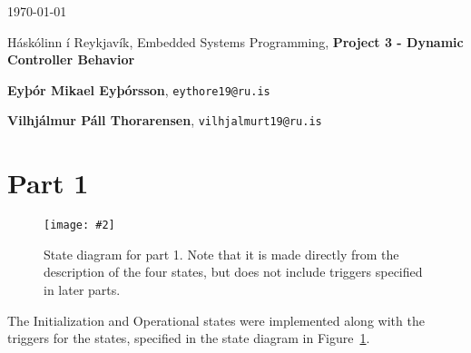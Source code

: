 \documentclass{article}
\newcommand{\state}[3]{
    \begin{figure}[h]
        \begin{center}
            \texttt{[image: \#2]}
        \end{center}
        \caption{#3}\label{fig:state-part-#1}
    \end{figure}
}
\begin{document}
\today \par
\vspace{.5cm}
\noindent Háskólinn í Reykjavík, Embedded Systems Programming, \textbf{Project 3 - Dynamic
	Controller Behavior} \par
\noindent \textbf{Eyþór Mikael Eyþórsson}, \texttt{eythore19@ru.is}\par
\noindent \textbf{Vilhjálmur Páll Thorarensen}, \texttt{vilhjalmurt19@ru.is}\par

\section*{Part 1}
\state{1}{../code/docs/diagrams/src/state-part1.mmd.png}{
    State diagram for part 1. Note that it is made directly from the description of the
    four states, but does not include triggers specified in later parts.
}

The Initialization and Operational states were implemented along with the triggers for the
states, specified in the state diagram in Figure~\ref{fig:state-part-1}.

\end{document}
